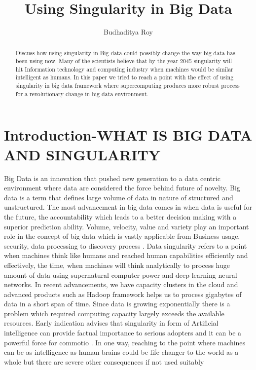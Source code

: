 \documentclass[sigconf]{acmart}
\begin{document}
\title{Using Singularity in Big Data}


\author{Budhaditya Roy}

\renewcommand{\shortauthors}{B.Roy.}


\begin{abstract}
Discuss how using singularity in Big data could possibly change the way big data has been using now. Many of the scientists believe that by the year 2045 singularity will hit Information technology and computing industry when machines would be similar intelligent as humans. In this paper we tried to reach a point with the effect of using singularity in big data framework where supercomputing produces more robust process for a revolutionary change in big data environment. 
\end{abstract}



\maketitle

\section{Introduction-WHAT IS BIG DATA AND SINGULARITY}
Big Data is an innovation that pushed new generation to a data centric environment where data are considered the force behind future of novelty. Big data is a term that defines large volume of data in nature of structured and unstructured. The most advancement in big data comes in when data is useful for the future, the accountability which leads to a better decision making with a superior prediction ability. Volume, velocity, value and variety play an important role in the concept of big data which is vastly applicable from Business usage, security, data processing to discovery process \cite{editor01}. Data singularity refers to a point when machines think like humans and reached human capabilities efficiently and effectively, the time, when machines will think analytically to process huge amount of data using supernatural computer power and deep learning neural networks. In recent advancements, we have capacity clusters in the cloud and advanced products such as Hadoop framework helps us to process gigabytes of data in a short span of time. Since data is growing exponentially there is a problem which required computing capacity largely exceeds the available resources. Early indication advises that singularity in form of Artificial intelligence can provide factual importance to serious adopters and it can be a powerful force for commotio \cite{editor01}. In one way, reaching to the point where machines can be as intelligence as human brains could be life changer to the world as a whole but there are severe other consequences if not used suitably
\end{document}
